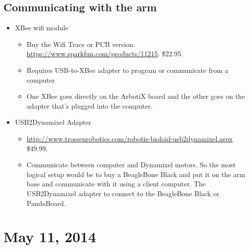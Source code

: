 \documentclass[letterpaper, 10 pt]{report}
\begin{document}
\subsection*{Communicating with the arm}
\begin{itemize}
  \item XBee wifi module
    \begin{itemize}
      \item Buy the Wifi Trace or PCB version. \url{https://www.sparkfun.com/products/11215}. \$22.95.
      \item Requires USB-to-XBee adapter to program or communicate from a computer
      \item One XBee goes directly on the ArbotiX board and the other goes on the adapter that's plugged into the computer.
    \end{itemize}
  \item USB2Dynamixel Adapter
    \begin{itemize}
      \item \url{http://www.trossenrobotics.com/robotis-bioloid-usb2dynamixel.aspx} \$49.99.
      \item Communicate between computer and Dynamixel motors. So the most logical setup would be to buy a BeagleBone Black and put it on the arm base and communicate with it using a client computer. The USB2Dynamixel adapter to connect to the BeagleBone Black or PandaBoard.
    \end{itemize}
\end{itemize}


\section*{May 11, 2014}
\end{document}

